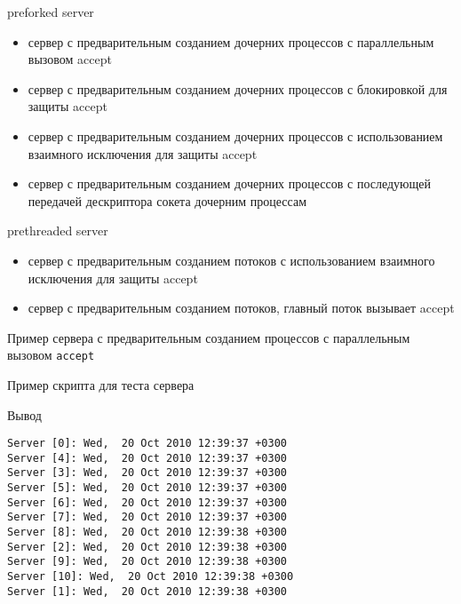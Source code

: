 \begin{frame}{preforked server}

	\begin{itemize}
		\item сервер с предварительным созданием дочерних процессов с параллельным вызовом accept
		\item сервер с предварительным созданием дочерних процессов с блокировкой  для защиты accept
		\item сервер с предварительным созданием дочерних процессов с использованием взаимного исключения для защиты  accept
		\item сервер с предварительным созданием дочерних процессов с последующей передачей дескриптора сокета дочерним процессам
	\end{itemize}
\end{frame}

\begin{frame}{prethreaded server}

	\begin{itemize}
		\item сервер с предварительным созданием потоков с использованием взаимного исключения для защиты accept
		\item сервер с предварительным созданием потоков,  главный поток вызывает accept
	\end{itemize}
\end{frame}


\begin{frame}[fragile]
{Пример сервера с предварительным созданием процессов с параллельным вызовом {\tt accept}}
	\tiny
\end{frame}


\begin{frame}[fragile]
	\tiny
\end{frame}
\begin{frame}[fragile]
	\tiny
\end{frame}

\begin{frame}[fragile]
{Пример скрипта для теста сервера}
	\scriptsize
\end{frame}

\begin{frame}[fragile]
{Вывод}
	\scriptsize
	\begin{verbatim}
Server [0]: Wed,  20 Oct 2010 12:39:37 +0300
Server [4]: Wed,  20 Oct 2010 12:39:37 +0300
Server [3]: Wed,  20 Oct 2010 12:39:37 +0300
Server [5]: Wed,  20 Oct 2010 12:39:37 +0300
Server [6]: Wed,  20 Oct 2010 12:39:37 +0300
Server [7]: Wed,  20 Oct 2010 12:39:37 +0300
Server [8]: Wed,  20 Oct 2010 12:39:38 +0300
Server [2]: Wed,  20 Oct 2010 12:39:38 +0300
Server [9]: Wed,  20 Oct 2010 12:39:38 +0300
Server [10]: Wed,  20 Oct 2010 12:39:38 +0300
Server [1]: Wed,  20 Oct 2010 12:39:38 +0300
	\end{verbatim}
\end{frame}


